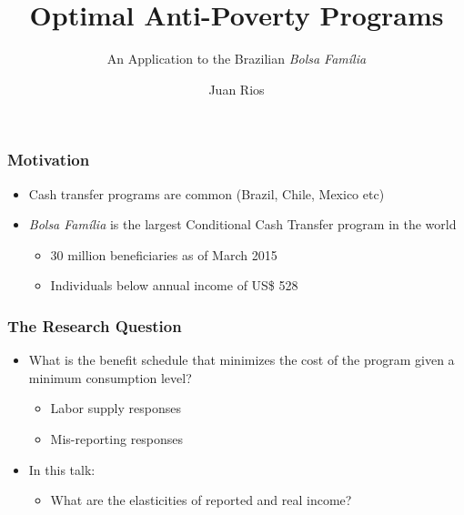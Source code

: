 \documentclass[xcolor=pdftex,dvipsnames,table]{beamer}
\begin{document}
\title{Optimal Anti-Poverty Programs}
\subtitle{An Application to the Brazilian \textit{Bolsa Fam\'ilia}}
\author{Juan Rios}

\maketitle

\begin{frame}
 \frametitle{Motivation}
\pause
\begin{itemize}
\item Cash transfer programs are common (Brazil, Chile, Mexico etc)
\pause
\item \textit{Bolsa Fam\'ilia} is the largest Conditional Cash Transfer program in the world
\begin{itemize}
\pause
\item 30 million beneficiaries as of March 2015
\pause
\item Individuals below annual income of US\$ 528
\end{itemize}
\end{itemize}
\end{frame}

\begin{frame}[label=question]
 \frametitle{The Research Question}
\begin{itemize}
\item What is the benefit schedule that minimizes the cost of the program given a minimum consumption level?
\pause
\begin{itemize}
\item Labor supply responses
\item Mis-reporting responses
\end{itemize}
\pause
\item In this talk:

\begin{itemize}
\item What are the elasticities of reported and real income?
\end{itemize}
\end{itemize}
\end{frame}
\end{document}
